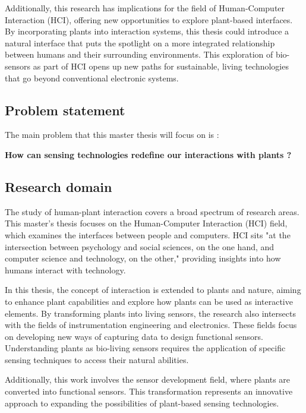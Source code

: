 Additionally, this research has implications for the field of Human-Computer Interaction (HCI), offering new opportunities to explore plant-based interfaces. By incorporating plants into interaction systems, this thesis could introduce a natural interface that puts the spotlight on a more integrated relationship between humans and their surrounding environments. This exploration of bio-sensors as part of HCI opens up new paths for sustainable, living technologies that go beyond conventional electronic systems.


\subsection{Problem statement}

The main problem that this master thesis will focus on is :

\begin{center}
    \textbf{How can sensing technologies redefine our interactions with plants ?}\\
\end{center}

\subsection{Research domain}

The study of human-plant interaction covers a broad spectrum of research areas. This master's thesis focuses on the Human-Computer Interaction (HCI) field, which examines the interfaces between people and computers. HCI sits "at the intersection between psychology and social sciences, on the one hand, and computer science and technology, on the other," \cite{carrollHUMANCOMPUTERINTERACTIONPsychology} providing insights into how humans interact with technology.

In this thesis, the concept of interaction is extended to plants and nature, aiming to enhance plant capabilities and explore how plants can be used as interactive elements. By transforming plants into living sensors, the research also intersects with the fields of instrumentation engineering and electronics. These fields focus on developing new ways of capturing data to design functional sensors. Understanding plants as bio-living sensors requires the application of specific sensing techniques to access their natural abilities.

Additionally, this work involves the sensor development field, where plants are converted into functional sensors. This transformation represents an innovative approach to expanding the possibilities of plant-based sensing technologies.


